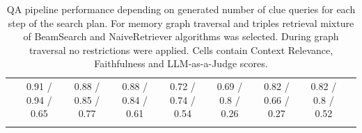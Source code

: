 \begin{table}[th!]
{\begin{tabular}{|cc|c|c|c|c|c|c||c|}
    \hhline{========::=}
    \multicolumn{2}{|c|}{Mean} & 0.91 / 0.94 / 0.65 & 0.88 / 0.85 / 0.77 & 0.88 / 0.84 / 0.61 & 0.72 / 0.74 / 0.54 & 0.69 / 0.8 / 0.26 & 0.82 / 0.66 / 0.27 & 0.82 / 0.8 / 0.52 \\ 
    \hhline{|--|-|-|-|-|-|-||-|}
    \end{tabular}}
    \renewcommand{\arraystretch}{1}
    \caption{QA pipeline performance depending on generated number of clue queries for each step of the search plan. For memory graph traversal and triples retrieval mixture of BeamSearch and NaiveRetriever algorithms was selected. During graph traversal no restrictions were applied. Cells contain Context Relevance, Faithfulness and LLM-as-a-Judge scores.}
	\label{tab:bsnr_all_maxcluequeries_ablation}
\end{table}

